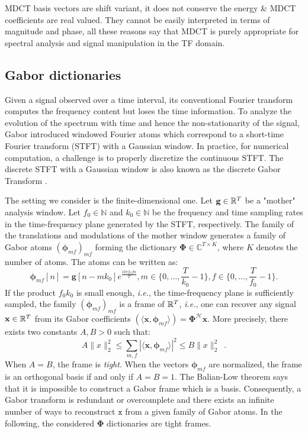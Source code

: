 MDCT basis vectors are shift variant, it does not conserve the energy \& MDCT coefficients are real valued. They cannot be easily interpreted in terms of magnitude and phase, all these reasons say that MDCT is purely appropriate for spectral analysis and signal manipulation in the TF domain.

\subsection{Gabor dictionaries}
Given a signal observed over a time interval, its conventional Fourier transform computes the frequency content but loses the time information. To analyze the evolution of the spectrum with time and hence the non-stationarity of the signal, Gabor introduced windowed Fourier atoms which correspond to a short-time Fourier transform (STFT) with a Gaussian window. In practice, for numerical computation, a challenge is to properly discretize the continuous STFT. The discrete STFT with a Gaussian window is also known as the discrete Gabor Transform \cite{gabor1946theory}.

The setting we consider is the finite-dimensional one. Let $\mathbf{g}\in \mathbb{R}^{T}$ be a "mother" analysis window. Let $f_0\in \mathbb{N}$ and $k_0\in \mathbb{N}$ be the frequency and time sampling rates in the time-frequency plane generated by the STFT, respectively. The family of the translations and modulations of the mother window generates a family of Gabor atoms $(\mathbf{\phi}_{mf})_{mf}$ forming the dictionary $\mathbf{\Phi}\in \mathbb{C}^{T\times K}$, where $K$ denotes the number of atoms. The atoms can be written as:
\begin{equation} \label{eq_gabor_atoms}
	\mathbf{\phi}_{mf}[n] = \mathbf{g}[n-mk_0]e^{\frac{i2\pi f_0 fn}{T}}, m\in \{0,\dots ,\frac{T}{k_0}-1\}, f\in \{0,\dots ,\frac{T}{f_0}-1\}.
\end{equation}
If the product $f_0k_0$ is small enough, \textit{i.e.}, the time-frequency plane is sufficiently sampled, the family $(\mathbf{\phi}_{mf})_{mf}$ is a frame of $\mathbb{R}^T$, \textit{i.e.}, one can recover any signal $\mathbf{x}\in \mathbb{R}^T$ from its Gabor coefficients $(\langle \mathbf{x}, \mathbf{\phi}_{mf}\rangle)=\mathbf{\Phi}^{\mathcal{H}}\mathbf{x}$. More precisely, there exists two constants $A, B > 0$ such that:
\begin{equation} \label{eq_frame}
	A\|x\|_2^2 \leq \sum_{m,f}|\langle \mathbf{x}, \mathbf{\phi}_{mf}\rangle|^2\leq B\|x\|_2^2 \enspace .
\end{equation}
When $A=B$, the frame is \textit{tight}. When the vectors $\mathbf{\phi}_{mf}$ are normalized, the frame is an orthogonal basis if and only if $A=B=1$. The Balian-Low theorem says that it is impossible to construct a Gabor frame which is a basis. Consequently, a Gabor transform is redundant or overcomplete and there exists an infinite number of ways to reconstruct $\mathtt{x}$ from a given family of Gabor atoms. In the following, the considered $\mathbf{\Phi}$ dictionaries are tight frames.

